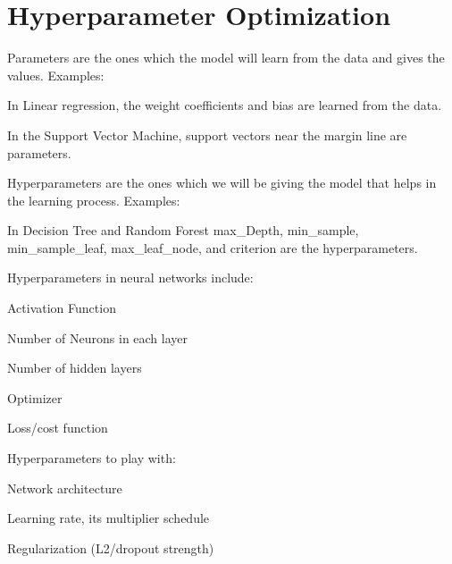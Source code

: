 	\section{Hyperparameter Optimization}
	\begin{bulletedlist}
		\item Parameters are the ones which the model will learn from the data and gives the values.  Examples:
		\begin{bulletedlist}
			\item In Linear regression, the weight coefficients and bias are learned from the data.
			\item In the Support Vector Machine, support vectors near the margin line are parameters.
		\end{bulletedlist}
		\item Hyperparameters are the ones which we will be giving the model that helps in the learning process.  Examples:
		\begin{bulletedlist}
			\item In Decision Tree and Random Forest max\_Depth, min\_sample, min\_sample\_leaf, max\_leaf\_node, and criterion are the hyperparameters.
		\end{bulletedlist}
	\end{bulletedlist}

	\vspace{\baselineskip}
	\begin{bulletedlist}
		\item Hyperparameters in neural networks include:
		\begin{bulletedlist}
			\item Activation Function
			\item Number of Neurons in each layer
			\item Number of hidden layers
			\item Optimizer
			\item Loss/cost function
		\end{bulletedlist}
		\item Hyperparameters to play with:
		\begin{bulletedlist}
			\item Network architecture
			\item Learning rate, its multiplier schedule
			\item Regularization (L2/dropout strength)
		\end{bulletedlist}
	\end{bulletedlist}

